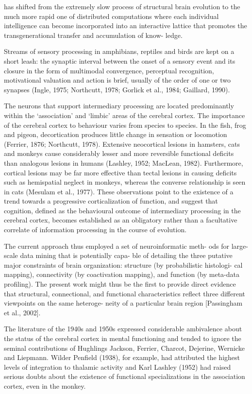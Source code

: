 \documentclass[authoryear,review,3p]{elsarticle}
\begin{document}
has shifted from the extremely slow process of structural brain evolution to the much more rapid one of distributed computations where each individual intelligence can become incorporated into an interactive lattice that promotes the transgenerational transfer and accumulation of know- ledge.

Streams of sensory processing in amphibians, reptiles and birds are kept on a short leash: the synaptic interval between the onset of a sensory event and its closure in the form of multimodal convergence, perceptual recognition, motivational valuation and action is brief, usually of the order of one or two synapses (Ingle, 1975; Northcutt, 1978; Gorlick et al., 1984; Gaillard, 1990). 

The neurons that support intermediary processing are located predominantly within the ‘association’ and ‘limbic’ areas of the cerebral cortex. The importance of the cerebral cortex to behaviour varies from species to species. In the fish, frog and pigeon, decortication produces little change in sensation or locomotion (Ferrier, 1876; Northcutt, 1978). Extensive neocortical lesions in hamsters, cats and monkeys cause considerably lesser and more reversible functional deficits than analogous lesions in humans (Lashley, 1952; MacLean, 1982). Furthermore, cortical lesions may be far more effective than tectal lesions in causing deficits such as hemispatial neglect in monkeys, whereas the converse relationship is seen in cats (Mesulam et al., 1977). These observations point to the existence of a trend towards a progressive corticalization of function, and suggest that cognition, defined as the behavioural outcome of intermediary processing in the cerebral cortex, becomes established as an obligatory rather than a facultative correlate of information processing in the course of evolution.



The current approach thus employed a set of neuroinformatic meth- ods for large-scale data mining that is potentially capa- ble of detailing the three putative major constraints of brain organization: structure (by probabilistic histologi- cal mapping), connectivity (by coactivation mapping), and function (by meta-data profiling). The present work might thus be the first to provide direct evidence that structural, connectional, and functional characteristics reflect three different viewpoints on the same heteroge- neity of a particular brain region [Passingham et al., 2002].

The literature of the 1940s and 1950s expressed considerable ambivalence about the status of the cerebral cortex in mental functioning and tended to ignore the seminal contributions of Hughlings Jackson, Ferrier, Charcot, Dejerine, Wernicke and Liepmann. Wilder Penfield (1938), for example, had attributed the highest levels of integration to thalamic activity and Karl Lashley (1952) had raised serious doubts about the existence of functional specializations in the association cortex, even in the monkey.
\end{document}
